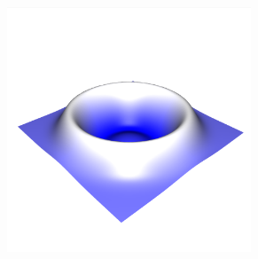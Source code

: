 \documentclass[crop=false]{standalone}
\begin{document}
\begin{figure}[h]
      \begin{subfigure}[b]{0.32\textwidth}
        \center
        \includegraphics[trim={0 0 0 2.2cm}, clip, width=0.8\textwidth]{images/intro_03.png}
        \caption{}
      \end{subfigure}


\end{figure}
\end{document}

